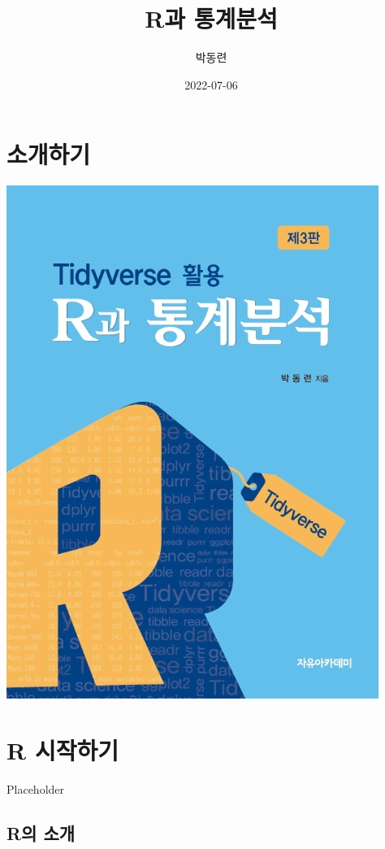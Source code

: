 \documentclass[
]{book}
\title{R과 통계분석}
\author{박동련}
\date{2022-07-06}
\begin{document}
\maketitle

{
\setcounter{tocdepth}{1}
\tableofcontents
}
\hypertarget{uxc18cuxac1cuxd558uxae30}{%
\chapter*{소개하기}\label{uxc18cuxac1cuxd558uxae30}}

\includegraphics{Figure/cover.jpg}

\hypertarget{r-uxc2dcuxc791uxd558uxae30}{%
\chapter{R 시작하기}\label{r-uxc2dcuxc791uxd558uxae30}}

Placeholder

\hypertarget{ruxc758-uxc18cuxac1c}{%
\section{R의 소개}\label{ruxc758-uxc18cuxac1c}}
\end{document}
